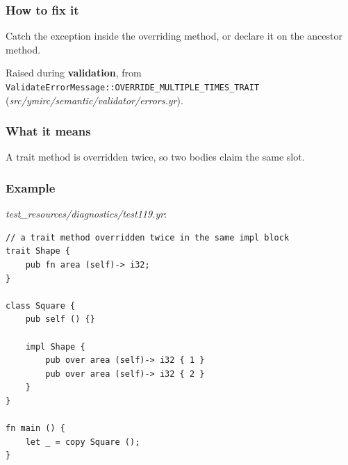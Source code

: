 \subsubsection*{How to fix it}

Catch the exception inside the overriding method, or declare it on the ancestor method.

\label{sec:codes:e4187}

Raised during \textbf{validation}, from \texttt{ValidateErrorMessage::\allowbreak{}OVERRIDE\_\allowbreak{}MULTIPLE\_\allowbreak{}TIMES\_\allowbreak{}TRAIT} (\textit{src/\allowbreak{}ymirc/\allowbreak{}semantic/\allowbreak{}validator/\allowbreak{}errors.yr}).

\subsubsection*{What it means}

A trait method is overridden twice, so two bodies claim the same slot.

\subsubsection*{Example}

\textit{test\_\allowbreak{}resources/\allowbreak{}diagnostics/\allowbreak{}test119.yr}:

\begin{lstlisting}[style=coloredverbatimError]
// a trait method overridden twice in the same impl block
trait Shape {
    pub fn area (self)-> i32;
}

class Square {
    pub self () {}

    impl Shape {
        pub over area (self)-> i32 { 1 }
        pub over area (self)-> i32 { 2 }
    }
}

fn main () {
    let _ = copy Square ();
}
\end{lstlisting}

